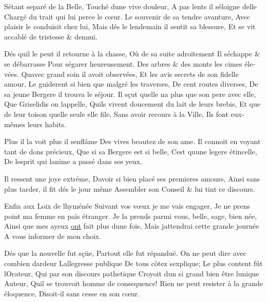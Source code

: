\documentclass[14pt,a4paper]{memoir}
\newcommand{\ul}[1]{\uline{#1}}
\begin{document}
{{\begin{otherlanguage}{french}
{S\textquotesingle étant separé de la Belle,} {Touché
d\textquotesingle une vive douleur,} {A pas lents il
s\textquotesingle éloigne d\textquotesingle elle} {Chargé du trait qui
lui perce le cœur.} {Le souvenir de sa tendre avanture,} {Avec plaisir
le conduisit chez lui,} {Mais dés le lendemain il sentit sa blessure,}
{Et se vit accablé de tristesse \& d\textquotesingle ennui.}

{Dés qu\textquotesingle il le peut il retourne à la chasse,} {Où de sa
suite adroitement} {Il s\textquotesingle échappe \& se débarrasse} {Pour
s\textquotesingle égarer heureusement.} {Des arbres \& des monts les
cimes élevées.} {Qu\textquotesingle avec grand soin il avoit observées,}
{Et les avis secrets de son fidelle amour,} {Le guiderent si bien que
malgré les traverses,} {De cent routes diverses,} {De sa jeune Bergere
il trouva le séjour.} {Il sçut qu\textquotesingle elle
n\textquotesingle a plus que son pere avec elle, } {Que Griselidis on
l\textquotesingle appelle,} {Qu\textquotesingle ils vivent doucement du
lait de leurs brebis, } {Et que de leur toison qu\textquotesingle elle
seule elle file,} {Sans avoir recours à la Ville,} {Ils font eux-mêmes
leurs habits.}

{Plus il la voit plus il s\textquotesingle enflâme} {Des vives beautez
de son ame.} {Il connoit en voyant tant de dons précieux,} {Que si sa
Bergere est si belle,} {C\textquotesingle est qu\textquotesingle une
legere étincelle,} {De l\textquotesingle esprit qui
l\textquotesingle anime a passé dans ses yeux.}

{Il ressent une joye extréme,} {D\textquotesingle avoir si bien placé
ses premieres amours,} {Ainsi sans plus tarder, il fit dés le jour même
} {Assembler son Conseil \& lui tint ce discours. }

{Enfin aux Loix de l\textquotesingle hyménée} {Suivant vos vœux je me
vais engager,} {Je ne prens point ma femme en païs étranger.} {Je la
prends parmi vous, belle, sage, bien née, } {Ainsi que mes ayeux
\ul{ont} fait plus d\textquotesingle une fois,} {Mais
j\textquotesingle attendrai cette grande journée} {A vous informer de
mon choix.}

{Dés que la nouvelle fut sçüe,} {Partout elle fut répanduë.} {On ne peut
dire avec combien d\textquotesingle ardeur}
{L\textquotesingle allegresse publique} {De tous côtez
s\textquotesingle explique;} {Le plus content fût
l\textquotesingle Orateur,} {Qui par son discours pathetique} {Croyoit
d\textquotesingle un si grand bien être l\textquotesingle unique Auteur,
} {Qu\textquotesingle il se trouvoit homme de consequence!} {Rien ne
peut resister à la grande éloquence,} {Disoit-il sans cesse en son
cœur.}


\end{otherlanguage}}}
\end{document}
